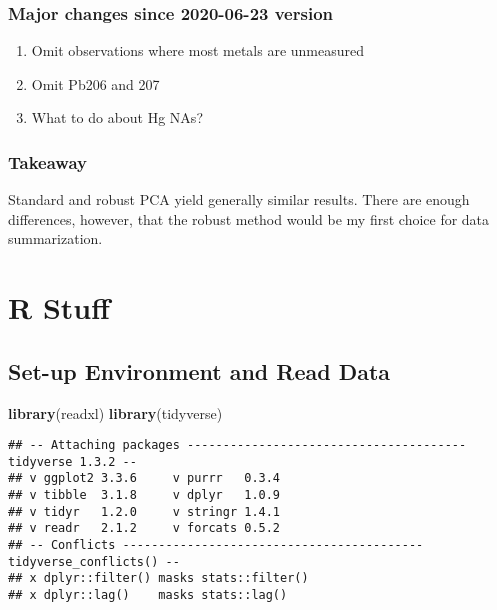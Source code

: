 \documentclass[]{article}
\newenvironment{Shaded}{\begin{snugshade}}{\end{snugshade}}
\newcommand{\KeywordTok}[1]{\textcolor[rgb]{0.13,0.29,0.53}{\textbf{#1}}}
\newcommand{\NormalTok}[1]{#1}
\providecommand{\tightlist}{%
  \setlength{\itemsep}{0pt}\setlength{\parskip}{0pt}}
\begin{document}
\hypertarget{major-changes-since-2020-06-23-version}{%
\subsubsection{Major changes since 2020-06-23
version}\label{major-changes-since-2020-06-23-version}}

\begin{enumerate}
\def\labelenumi{\arabic{enumi}.}
\tightlist
\item
  Omit observations where most metals are unmeasured
\item
  Omit Pb206 and 207
\item
  What to do about Hg NAs?
\end{enumerate}

\hypertarget{takeaway}{%
\subsubsection{Takeaway}\label{takeaway}}

Standard and robust PCA yield generally similar results. There are
enough differences, however, that the robust method would be my first
choice for data summarization.

\hypertarget{r-stuff}{%
\section{R Stuff}\label{r-stuff}}

\hypertarget{set-up-environment-and-read-data}{%
\subsection{Set-up Environment and Read
Data}\label{set-up-environment-and-read-data}}

\begin{Shaded}
\begin{Highlighting}[]
\KeywordTok{library}\NormalTok{(readxl)}
\KeywordTok{library}\NormalTok{(tidyverse)}
\end{Highlighting}
\end{Shaded}

\begin{verbatim}
## -- Attaching packages --------------------------------------- tidyverse 1.3.2 --
## v ggplot2 3.3.6     v purrr   0.3.4
## v tibble  3.1.8     v dplyr   1.0.9
## v tidyr   1.2.0     v stringr 1.4.1
## v readr   2.1.2     v forcats 0.5.2
## -- Conflicts ------------------------------------------ tidyverse_conflicts() --
## x dplyr::filter() masks stats::filter()
## x dplyr::lag()    masks stats::lag()
\end{verbatim}
\end{document}
